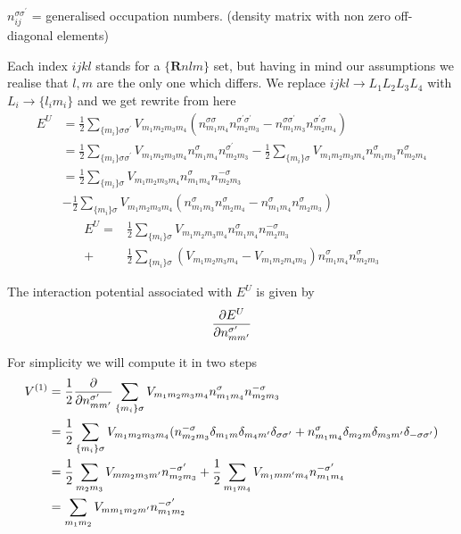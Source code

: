 \par{$n_{ij}^{\sigma\sigma^\prime}$ = generalised occupation numbers. (density matrix with non zero off-diagonal elements)}
\par{Each index $ijkl$ stands for a $ \lbrace \bm{R}nlm \rbrace $ set, but having in mind our assumptions we realise
that $l,m$ are the only one which differs. We replace ${ijkl} \rightarrow {L_1L_2L_3L_4}$ with $L_i \rightarrow \lbrace l_im_i \rbrace$ and we get}
rewrite from here
\begin{equation*}
\begin{split}
E^U&=\frac{1}{2}\sum_{\{m_i\}\sigma\sigma^\prime}V_{m_1m_2m_3m_4}
(n_{m_1m_4}^{\sigma\sigma}n_{m_2m_3}^{\sigma^\prime\sigma^\prime}-
n_{m_1m_3}^{\sigma\sigma^\prime}n_{m_2m_4}^{\sigma^\prime\sigma})\\
&=\frac{1}{2}\sum_{\{m_i\}\sigma\sigma^\prime}V_{m_1m_2m_3m_4}
n_{m_1m_4}^{\sigma}n_{m_2m_3}^{\sigma^\prime}-\frac{1}{2}\sum_{\{m_i\}\sigma}V_{m_1m_2m_3m_4}
n_{m_1m_3}^{\sigma}n_{m_2m_4}^{\sigma}\\
&=\frac{1}{2}\sum_{\{m_i\}\sigma}V_{m_1m_2m_3m_4}n_{m_1m_4}^{\sigma}n_{m_2m_3}^{-\sigma}\\&-
\frac{1}{2}\sum_{\{m_i\}\sigma}V_{m_1m_2m_3m_4}
(n_{m_1m_3}^{\sigma}n_{m_2m_4}^{\sigma}-n_{m_1m_4}^{\sigma}n_{m_2m_3}^{\sigma})
\end{split}
\end{equation*}
\begin{equation}
\label{Eu}
\begin{split}
E^U=&\frac{1}{2}\sum_{\{m_i\}\sigma}V_{m_1m_2m_3m_4}n_{m_1m_4}^{\sigma}n_{m_2m_3}^{-\sigma}\\+&
\frac{1}{2}\sum_{\{m_i\}\sigma}(V_{m_1m_2m_3m_4}-V_{m_1m_2m_4m_3})
n_{m_1m_4}^{\sigma}n_{m_2m_3}^{\sigma}
\end{split}
\end{equation}
%
\par{The interaction potential associated with $E^U$ is given by}
\begin{equation*}
\frac{\partial E^U}{\partial n_{mm^\prime}^{\sigma^\prime}}
\end{equation*}
%
\par{For simplicity we will compute it in two steps}
%
\begin{equation}
\begin{split}
V^{(1)}&=\frac{1}{2}\frac{\partial }{\partial n_{mm^\prime}^{\sigma^\prime}}\sum_{\{m_i\}\sigma}V_{m_1m_2m_3m_4}n_{m_1m_4}^{\sigma}n_{m_2m_3}^{-\sigma}\\
&=\frac{1}{2}\sum_{\{m_i\}\sigma}V_{m_1m_2m_3m_4}(n_{m_2m_3}^{-\sigma}\delta_{m_1m}\delta_{m_4m^\prime}\delta_{\sigma\sigma^\prime}
+n_{m_1m_4}^{\sigma}\delta_{m_2m}\delta_{m_3m^\prime}\delta_{-\sigma\sigma^\prime})\\
&=\frac{1}{2}\sum_{m_2m_3}V_{mm_2m_3m^{\prime}}n_{m_2m_3}^{-\sigma^{\prime}}
+\frac{1}{2}\sum_{m_1m_4}V_{m_1mm^{\prime}m_4}n_{m_1m_4}^{-\sigma^{\prime}}\\
&=\sum_{m_1m_2}V_{mm_1m_2m^{\prime}}n_{m_1m_2}^{-\sigma^{\prime}}
\end{split}
\end{equation}

